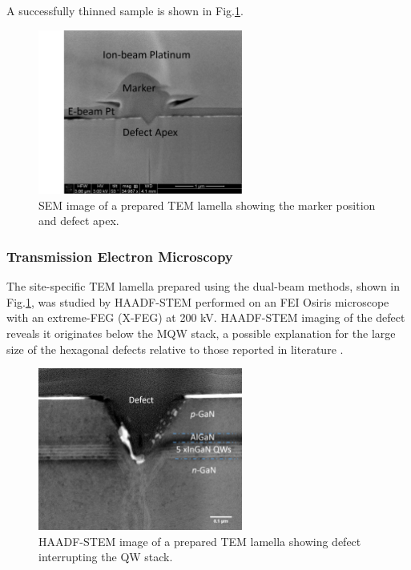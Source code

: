 A successfully thinned sample is shown in Fig.\ref{thinned}.

\begin{figure}[h]
	\centering
	\includegraphics[width=0.6\textwidth]{Figs/Ch3/thinned}
	\caption[h] {SEM image of a prepared TEM lamella showing the marker position and defect apex.}
	\label{thinned}
\end{figure}
\FloatBarrier 


\subsubsection{Transmission Electron Microscopy}

The site-specific TEM lamella prepared using the dual-beam methods, shown in Fig.\ref{thinned}, was studied by HAADF-STEM performed on an FEI Osiris microscope with an extreme-FEG (X-FEG)  at 200 kV. HAADF-STEM imaging of the defect reveals it originates below the MQW stack, a possible explanation for the large size of the hexagonal defects relative to those reported in literature \cite{Hangleiter2005,Tsai2007,Oliver2006a}. 

\begin{figure}[h]
	\centering
	\includegraphics[width=0.6\textwidth]{Figs/Ch3/STEM-spot}
	\caption[h] {HAADF-STEM image of a prepared TEM lamella showing defect interrupting the QW stack.}
	\label{STEM-spot}
\end{figure}
\FloatBarrier 

